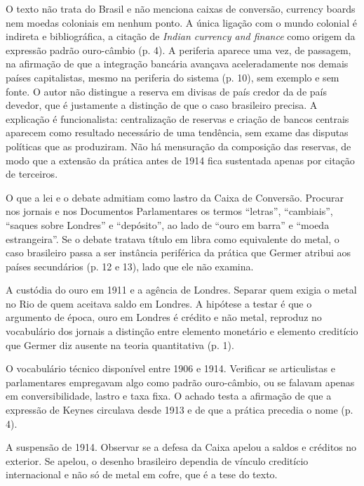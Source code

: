 O texto não trata do Brasil e não menciona caixas de conversão, currency boards
nem moedas coloniais em nenhum ponto. A única ligação com o mundo colonial é
indireta e bibliográfica, a citação de \textit{Indian currency and finance} como
origem da expressão padrão ouro-câmbio (p. 4). A periferia aparece uma vez, de
passagem, na afirmação de que a integração bancária avançava aceleradamente nos
demais países capitalistas, mesmo na periferia do sistema (p. 10), sem exemplo e
sem fonte. O autor não distingue a reserva em divisas de país credor da de país
devedor, que é justamente a distinção de que o caso brasileiro precisa. A
explicação é funcionalista: centralização de reservas e criação de bancos
centrais aparecem como resultado necessário de uma tendência, sem exame das
disputas políticas que as produziram. Não há mensuração da composição das
reservas, de modo que a extensão da prática antes de 1914 fica sustentada apenas
por citação de terceiros.

\begin{dialogo}
\item O que a lei e o debate admitiam como lastro da Caixa de Conversão.
Procurar nos jornais e nos Documentos Parlamentares os termos ``letras'',
``cambiais'', ``saques sobre Londres'' e ``depósito'', ao lado de ``ouro em
barra'' e ``moeda estrangeira''. Se o debate tratava título em libra como
equivalente do metal, o caso brasileiro passa a ser instância periférica da
prática que Germer atribui aos países secundários (p. 12 e 13), lado que ele não
examina.
\item A custódia do ouro em 1911 e a agência de Londres. Separar quem exigia o
metal no Rio de quem aceitava saldo em Londres. A hipótese a testar é que o
argumento de época, ouro em Londres é crédito e não metal, reproduz no
vocabulário dos jornais a distinção entre elemento monetário e elemento
creditício que Germer diz ausente na teoria quantitativa (p. 1).
\item O vocabulário técnico disponível entre 1906 e 1914. Verificar se
articulistas e parlamentares empregavam algo como padrão ouro-câmbio, ou se
falavam apenas em conversibilidade, lastro e taxa fixa. O achado testa a
afirmação de que a expressão de Keynes circulava desde 1913 e de que a prática
precedia o nome (p. 4).
\item A suspensão de 1914. Observar se a defesa da Caixa apelou a saldos e
créditos no exterior. Se apelou, o desenho brasileiro dependia de vínculo
creditício internacional e não só de metal em cofre, que é a tese do texto.
\end{dialogo}

